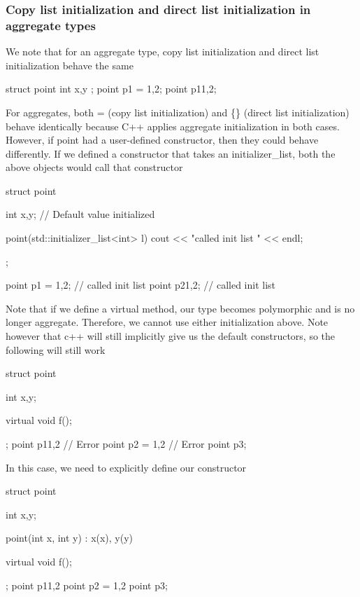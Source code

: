 \documentclass{report}
\begin{document}
    \subsubsection{Copy list initialization and direct list initialization in aggregate types}
    \bigbreak \noindent 
    We note that for an aggregate type, copy list initialization and direct list initialization behave the same
    \bigbreak \noindent 
    \begin{cppcode}
        struct point {
            int x,y
        };
        point p1 = {1,2};
        point p1{1,2};
    \end{cppcode}
    \bigbreak \noindent 
    For aggregates, both = (copy list initialization) and \{\} (direct list initialization) behave identically because C++ applies aggregate initialization in both cases.
    \bigbreak \noindent 
    However, if point had a user-defined constructor, then they could behave differently.
    \bigbreak \noindent 
    If we defined a constructor that takes an initializer\_list, both the above objects would call that constructor
    \bigbreak \noindent 
    \begin{cppcode}
        struct  point {
            int x{},y{}; // Default value initialized

            point(std::initializer_list<int> l) {
                cout << "called init list " << endl;
            }
        };

        point p1 = {1,2}; // called init list
        point p2{1,2}; // called init list
    \end{cppcode}

    \bigbreak \noindent 
    Note that if we define a virtual method, our type becomes polymorphic and is no longer aggregate. Therefore, we cannot use either initialization above. Note however that c++ will still implicitly give us the default constructors, so the following will still work
    \bigbreak \noindent 
    \begin{cppcode}
        struct point {
            int x,y;

            virtual void f();
        };
        point p1{1,2} // Error
        point p2 = {1,2} // Error
        point p3{};
    \end{cppcode}
    \bigbreak \noindent 
    In this case, we need to explicitly define our constructor
    \bigbreak \noindent 
    \begin{cppcode}
        struct point {
            int x,y;

            point(int x, int y) : x(x), y(y) {}

            virtual void f();
        };
        point p1{1,2} 
        point p2 = {1,2} 
        point p3{};
    \end{cppcode}
\end{document}
